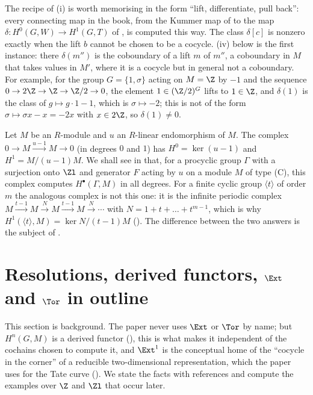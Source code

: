 The recipe of (i) is worth memorising in the form ``lift, differentiate, pull back'': every connecting map in the book, from the Kummer map of
 to the map $\delta\colon H^0(G,W)\to H^1(G,T)$ of , is computed this way. The class $\delta[c]$ is nonzero
exactly when the lift $b$ cannot be chosen to be a cocycle. (iv) below is the first instance: there $\delta(m'')$ is the
coboundary of a lift $m$ of $m''$, a coboundary in $M$ that takes values in $M'$, where it is a cocycle but in general not a coboundary. For example, for
the group $G=\{1,\sigma\}$ acting on $M=\Z$ by $-1$ and the sequence $0\to2\Z\to\Z\to\Z/2\to0$, the element $1\in(\Z/2)^G$ lifts to $1\in\Z$, and
$\delta(1)$ is the class of $g\mapsto g\cdot1-1$, which is $\sigma\mapsto-2$; this is not of the form $\sigma\mapsto\sigma x-x=-2x$ with $x\in2\Z$, so $\delta(1)\ne0$.

\begin{example}\label{ex:cohomology:two-term}
Let $M$ be an $R$-module and $u$ an $R$-linear endomorphism of $M$. The complex $0\to M\xrightarrow{u-1}M\to0$ (in degrees $0$ and $1$) has
$H^0=\ker(u-1)$ and $H^1=M/(u-1)M$. We shall see in  that, for a procyclic group $\Gamma$ with a surjection onto $\Zl$
and generator $F$ acting by $u$ on a module $M$ of type (C), this complex computes $H^\bullet(\Gamma,M)$ in all degrees. For a finite cyclic group
$\langle t\rangle$ of order $m$ the analogous complex is not this one: it is the infinite periodic complex
$M\xrightarrow{t-1}M\xrightarrow{N}M\xrightarrow{t-1}M\xrightarrow{N}\cdots$ with $N=1+t+\dots+t^{m-1}$, which is why $H^1(\langle t\rangle,M)=\ker N/(t-1)M$
(). The difference between the two answers is the subject of .
\end{example}

\section[Resolutions, derived functors, Ext and Tor]{Resolutions, derived functors, $\Ext$ and $\Tor$ in outline}\label{sec:cohomology:derived}

This section is background. The paper never uses $\Ext$ or $\Tor$ by name; but $H^n(G,M)$ is a derived functor
(), this is what makes it independent of the cochains chosen to compute it, and $\Ext^1$ is the conceptual home of the
``cocycle in the corner'' of a reducible two-dimensional representation, which the paper uses for the Tate curve (). We
state the facts with references and compute the examples over $\Z$ and $\Zl$ that occur later.

